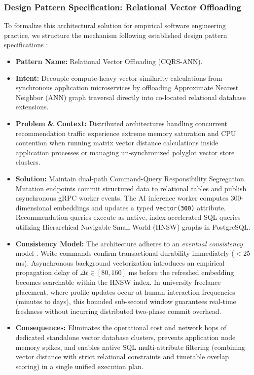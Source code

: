\documentclass[a4paper,fleqn]{cas-dc}
\begin{document}
\subsubsection{Design Pattern Specification: Relational Vector Offloading}
To formalize this architectural solution for empirical software engineering practice, we structure the mechanism following established design pattern specifications \cite{richardson2018}:
\begin{itemize}
    \item \textbf{Pattern Name:} Relational Vector Offloading (CQRS-ANN).
    \item \textbf{Intent:} Decouple compute-heavy vector similarity calculations from synchronous application microservices by offloading Approximate Nearest Neighbor (ANN) graph traversal directly into co-located relational database extensions.
    \item \textbf{Problem \& Context:} Distributed architectures handling concurrent recommendation traffic experience extreme memory saturation and CPU contention when running matrix vector distance calculations inside application processes or managing un-synchronized polyglot vector store clusters.
    \item \textbf{Solution:} Maintain dual-path Command-Query Responsibility Segregation. Mutation endpoints commit structured data to relational tables and publish asynchronous gRPC worker events. The AI inference worker computes 300-dimensional embeddings and updates a typed \texttt{vector(300)} attribute. Recommendation queries execute as native, index-accelerated SQL queries utilizing Hierarchical Navigable Small World (HNSW) graphs in PostgreSQL.
    \item \textbf{Consistency Model:} The architecture adheres to an \textit{eventual consistency} model \cite{richardson2018}. Write commands confirm transactional durability immediately ($<25$ ms). Asynchronous background vectorization introduces an empirical propagation delay of $\Delta t \in [80, 160]$ ms before the refreshed embedding becomes searchable within the HNSW index. In university freelance placement, where profile updates occur at human interaction frequencies (minutes to days), this bounded sub-second window guarantees real-time freshness without incurring distributed two-phase commit overhead.
    \item \textbf{Consequences:} Eliminates the operational cost and network hops of dedicated standalone vector database clusters, prevents application node memory spikes, and enables native SQL multi-attribute filtering (combining vector distance with strict relational constraints and timetable overlap scoring) in a single unified execution plan.
\end{itemize}
\end{document}
